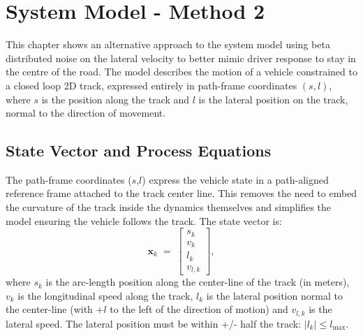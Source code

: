 \section{System Model - Method 2}
\label{sec:system_model}

This chapter shows an alternative approach to the system model using beta distributed noise on the lateral velocity to better mimic driver response to stay in the centre of the road. The model describes the motion of a vehicle constrained to a closed loop 2D track, expressed entirely in path-frame coordinates $(s,l)$, where $s$ is the position along the track and $l$ is the lateral position on the track, normal to the direction of movement. 

\subsection{State Vector and Process Equations}
\label{subsec:state_model}

The path-frame coordinates ($s$,$l$) express the vehicle state in a path-aligned reference frame attached to the track center line. This removes the need to embed the curvature of the track inside the dynamics themselves and simplifies the model ensuring the vehicle follows the track.  The state vector is:
\begin{equation}
    \mathbf{x}_k \;=\; \begin{bmatrix} s_k \\ v_k \\ l_k \\ v_{l,k} \end{bmatrix},
    \label{eq:state_vector}
\end{equation}
where $s_k$ is the arc-length position along the center-line of the track (in meters), $v_k$ is the longitudinal speed along the track, $l_k$ is the lateral position normal to the center-line (with $+l$ to the left of the direction of motion) and $v_{l,k}$ is the lateral speed. The lateral position must be within +/- half the track: $|l_k|\leq l_{\max}$.

